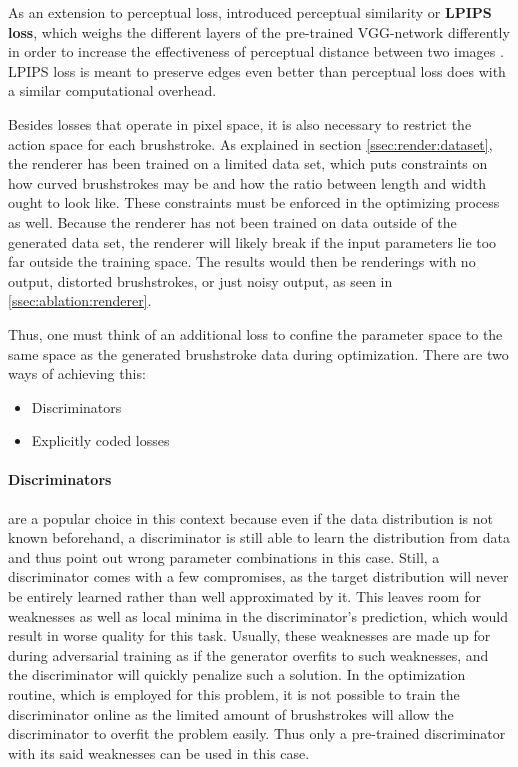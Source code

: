 As an extension to perceptual loss, \citeauthor*{lpips} introduced perceptual similarity or \textbf{LPIPS loss}, which weighs the different layers of the pre-trained VGG-network differently in order to increase the effectiveness of perceptual distance between two images \cite{lpips}.
LPIPS loss is meant to preserve edges even better than perceptual loss does with a similar computational overhead.

Besides losses that operate in pixel space, it is also necessary to restrict the action space for each brushstroke.
As explained in section \ref{ssec:render:dataset}, the renderer has been trained on a limited data set, which puts constraints on how curved brushstrokes may be and how the ratio between length and width ought to look like.
These constraints must be enforced in the optimizing process as well.
Because the renderer has not been trained on data outside of the generated data set, the renderer will likely break if the input parameters lie too far outside the training space.
The results would then be renderings with no output, distorted brushstrokes, or just noisy output, as seen in \ref{ssec:ablation:renderer}.

Thus, one must think of an additional loss to confine the parameter space to the same space as the generated brushstroke data during optimization.
There are two ways of achieving this:
\begin{itemize}
    \item Discriminators
    \item Explicitly coded losses
\end{itemize}

\paragraph{Discriminators} are a popular choice in this context because even if the data distribution is not known beforehand, a discriminator is still able to learn the distribution from data and thus point out wrong parameter combinations in this case.
Still, a discriminator comes with a few compromises, as the target distribution will never be entirely learned rather than well approximated by it.
This leaves room for weaknesses as well as local minima in the discriminator's prediction, which would result in worse quality for this task.
Usually, these weaknesses are made up for during adversarial training as if the generator overfits to such weaknesses, and the discriminator will quickly penalize such a solution.
In the optimization routine, which is employed for this problem, it is not possible to train the discriminator online as the limited amount of brushstrokes will allow the discriminator to overfit the problem easily.
Thus only a pre-trained discriminator with its said weaknesses can be used in this case.

